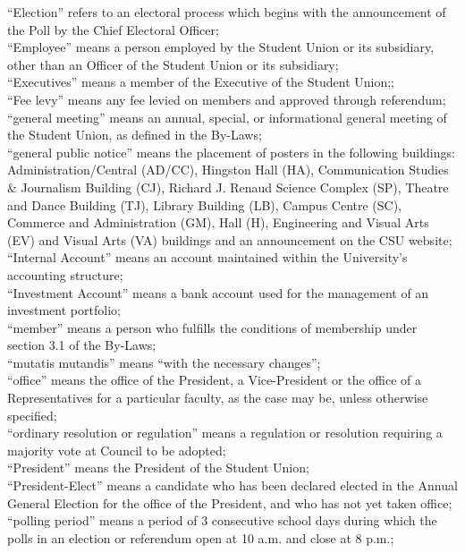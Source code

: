 \documentclass[oneside]{book}
\begin{document}
``Election'' refers to an electoral process
which begins with the announcement of the Poll by the Chief Electoral
Officer; \\
``Employee'' means a person employed by
the Student Union or its subsidiary, other than an Officer of the
Student Union or its subsidiary; \\
``Executives'' means a member of the Executive
of the Student Union;; \\
``Fee levy'' means any fee levied on members
and approved through referendum; \\
``general meeting'' means an annual, special,
or informational general meeting of the Student Union, as defined
in the By-Laws; \\
``general public notice'' means the placement
of posters in the following buildings: Administration/Central (AD/CC),
Hingston Hall (HA), Communication Studies \& Journalism Building (CJ),
Richard J. Renaud Science Complex (SP), Theatre and Dance Building
(TJ), Library Building (LB), Campus Centre (SC), Commerce and Administration
(GM), Hall (H), Engineering and Visual Arts (EV) and Visual Arts (VA)
buildings and an announcement on the CSU website; \\
``Internal Account'' means an account maintained within the University's accounting structure; \\
``Investment Account'' means a bank account used for the management of an investment portfolio; \\
``member'' means a person who fulfills the
conditions of membership under section 3.1 of the By-Laws; \\
``mutatis mutandis'' means ``with
the necessary changes''; \\
``office'' means the office of the President,
a Vice-President or the office of a Representatives for a particular
faculty, as the case may be, unless otherwise specified; \\
``ordinary resolution or regulation'' means a regulation or resolution
requiring a majority vote at Council to be adopted; \\
``President'' means the President of the
Student Union; \\
``President-Elect'' means a candidate who
has been declared elected in the Annual General Election for the office
of the President, and who has not yet taken office; \\
``polling period'' means a period of 3 consecutive
school days during which the polls in an election or referendum open
at 10 a.m. and close at 8 p.m.; \\
\end{document}
